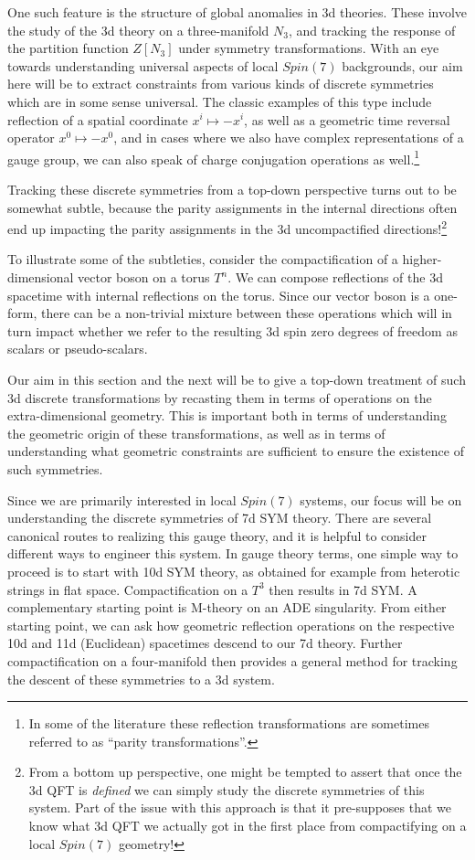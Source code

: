 \documentclass[12pt]{article}%
\numberwithin{equation}{section}
\renewcommand{\(}{\left(}
\renewcommand{\)}{\right)}
\renewcommand{\[}{\left[}
\renewcommand{\]}{\right]}
\begin{document}
One such feature is the structure of global anomalies in 3d theories. These involve the study
of the 3d theory on a three-manifold $N_3$, and tracking the response of the partition
function $Z[N_3]$ under symmetry transformations. With an eye towards understanding
universal aspects of local $Spin(7)$ backgrounds, our aim here will be to extract constraints from
various kinds of discrete symmetries which are in some sense universal. The classic examples of this type include reflection of a
spatial coordinate $x^i \mapsto - x^i$, as well as a geometric time reversal operator $x^0 \mapsto - x^0$, and in cases where we also have complex representations of a gauge group, we can also speak of charge conjugation operations as well.\footnote{In some of the literature these reflection transformations are sometimes referred to as ``parity transformations''.}

Tracking these discrete symmetries from a top-down perspective turns out to be somewhat subtle,
because the parity assignments in the internal directions often end up impacting the parity assignments
in the 3d uncompactified directions!\footnote{From a bottom up perspective, one might be tempted
to assert that once the 3d QFT is \textit{defined} we can simply study the discrete symmetries of this system.
Part of the issue with this approach is that it pre-supposes that we know what 3d QFT we actually got in
the first place from compactifying on a local $Spin(7)$ geometry!}

To illustrate some of the subtleties, consider the compactification of a higher-dimensional
vector boson on a torus $T^n$. We can compose reflections of the 3d spacetime with internal
reflections on the torus. Since our vector boson is a one-form, there can be a non-trivial
mixture between these operations which will in turn impact whether we refer to the resulting
3d spin zero degrees of freedom as scalars or pseudo-scalars.

Our aim in this section and the next will be to give a top-down treatment of such 3d discrete transformations
by recasting them in terms of operations on the extra-dimensional geometry. This is important both
in terms of understanding the geometric origin of these transformations, as well as in terms of
understanding what geometric constraints are sufficient to ensure the existence of such symmetries.

Since we are primarily interested in local $Spin(7)$ systems, our focus will be on understanding
the discrete symmetries of 7d SYM theory. There are several canonical routes to realizing this
gauge theory, and it is helpful to consider different ways to engineer this system. In gauge theory terms,
one simple way to proceed is to start with 10d SYM theory, as obtained for example from heterotic strings
in flat space. Compactification on a $T^3$ then results in 7d SYM. A complementary starting point
is M-theory on an ADE singularity. From either starting point, we can ask how geometric reflection
operations on the respective 10d and 11d (Euclidean) spacetimes descend to our 7d theory.
Further compactification on a four-manifold then provides a general method for tracking the descent of these symmetries to a 3d system.
\end{document}
